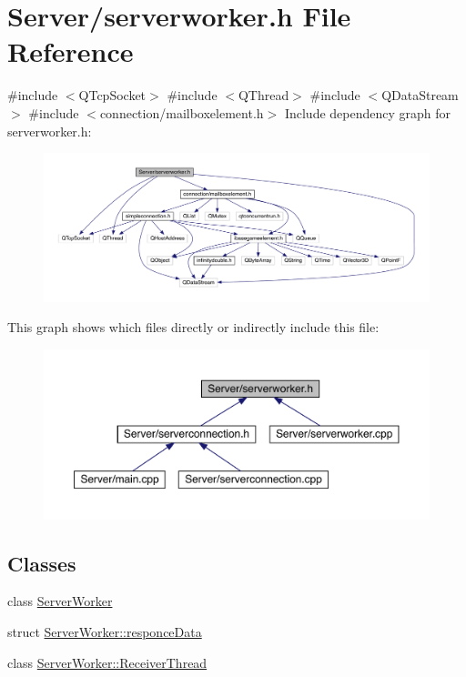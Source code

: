 \hypertarget{a00110}{}\section{Server/serverworker.h File Reference}
\label{a00110}
{\ttfamily \#include $<$Q\+Tcp\+Socket$>$}\newline
{\ttfamily \#include $<$Q\+Thread$>$}\newline
{\ttfamily \#include $<$Q\+Data\+Stream$>$}\newline
{\ttfamily \#include $<$connection/mailboxelement.\+h$>$}\newline
Include dependency graph for serverworker.\+h\+:
\nopagebreak
\begin{figure}[H]
\begin{center}
\leavevmode
\includegraphics[width=350pt]{dd/d6d/a00111}
\end{center}
\end{figure}
This graph shows which files directly or indirectly include this file\+:
\nopagebreak
\begin{figure}[H]
\begin{center}
\leavevmode
\includegraphics[width=350pt]{db/d57/a00112}
\end{center}
\end{figure}
\subsection*{Classes}
\begin{DoxyCompactItemize}
\item 
class \hyperlink{a00185}{Server\+Worker}
\item 
struct \hyperlink{a00189}{Server\+Worker\+::responce\+Data}
\item 
class \hyperlink{a00193}{Server\+Worker\+::\+Receiver\+Thread}
\end{DoxyCompactItemize}
